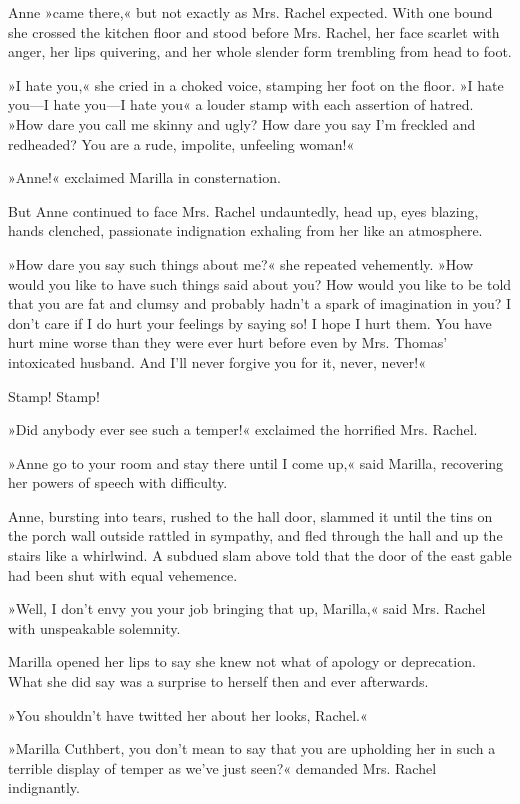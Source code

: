Anne »came there,« but not exactly as Mrs. Rachel expected. With one bound she crossed the kitchen floor and stood before Mrs. Rachel, her face scarlet with anger, her lips quivering, and her whole slender form trembling from head to foot.

»I hate you,« she cried in a choked voice, stamping her foot on the floor. »I hate you—I hate you—I hate you\longdash« a louder stamp with each assertion of hatred. »How dare you call me skinny and ugly? How dare you say I'm freckled and redheaded? You are a rude, impolite, unfeeling woman!«

»Anne!« exclaimed Marilla in consternation.

But Anne continued to face Mrs. Rachel undauntedly, head up, eyes blazing, hands clenched, passionate indignation exhaling from her like an atmosphere.

»How dare you say such things about me?« she repeated vehemently. »How would you like to have such things said about you? How would you like to be told that you are fat and clumsy and probably hadn't a spark of imagination in you? I don't care if I do hurt your feelings by saying so! I hope I hurt them. You have hurt mine worse than they were ever hurt before even by Mrs. Thomas' intoxicated husband. And I'll never forgive you for it, never, never!«

Stamp! Stamp!

»Did anybody ever see such a temper!« exclaimed the horrified Mrs. Rachel.

»Anne go to your room and stay there until I come up,« said Marilla, recovering her powers of speech with difficulty.

Anne, bursting into tears, rushed to the hall door, slammed it until the tins on the porch wall outside rattled in sympathy, and fled through the hall and up the stairs like a whirlwind. A subdued slam above told that the door of the east gable had been shut with equal vehemence.

»Well, I don't envy you your job bringing that up, Marilla,« said Mrs. Rachel with unspeakable solemnity.

Marilla opened her lips to say she knew not what of apology or deprecation. What she did say was a surprise to herself then and ever afterwards.

»You shouldn't have twitted her about her looks, Rachel.«

»Marilla Cuthbert, you don't mean to say that you are upholding her in such a terrible display of temper as we've just seen?« demanded Mrs. Rachel indignantly.


